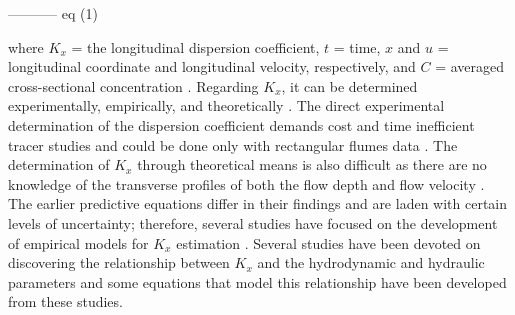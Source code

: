 \documentclass[a4paper,12pt, english]{article}
\begin{document}
----------- eq (1)


where $K_x$ = the longitudinal dispersion coefficient, $t$ = time, $x$ and $u$ = longitudinal coordinate and longitudinal velocity, respectively, and $C$ = averaged cross-sectional concentration \cite{noori2011framework}. Regarding $K_x$, it can be determined experimentally, empirically, and theoretically \cite{perucca2009estimation, wang2016estimating, data2019estimation, milivsic2019estimation, deng2001longitudinal, deng2002longitudinal, seo2004estimation, shin2019longitudinal, seo1998predicting, swamee2000empirical, zeng2014estimation, disley2015predictive, camacho2019quantifying}. The direct experimental determination of the dispersion coefficient demands cost and time inefficient tracer studies and could be done only with rectangular flumes data \cite{etemad2012predicting}. The determination of $K_x$ through theoretical means is also difficult as there are no knowledge of the transverse profiles of both the flow depth and flow velocity \cite{deng2001longitudinal}. The earlier predictive equations differ in their findings and are laden with certain levels of uncertainty; therefore, several studies have focused on the development of empirical models for $K_x$ estimation \cite{wang2017physically, altunkaynak2016prediction,nezaratian2018sensitivity}. Several studies have been devoted on discovering the relationship between $K_x$ and the hydrodynamic and  hydraulic parameters \cite{sahin2014empirical, tutmez2013regression,shen2010estimating} and some equations that model this relationship have been developed from these studies.
\end{document}
